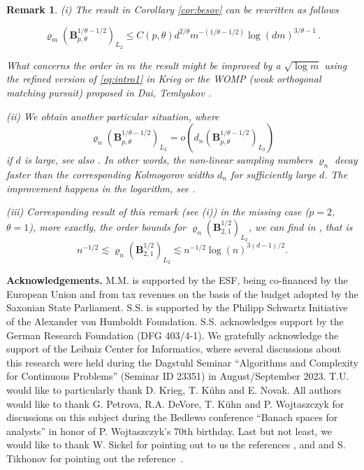 \documentclass[11pt,reqno]{article}
\numberwithin{equation}{section}
\theoremstyle{definition}
\theoremstyle{plain}
\newtheorem*{rem*}{Remark}
\begin{document}
 \begin{rem*}{\em (i)} The result in  Corollary \ref{cor:besov} can be rewritten as follows
  
$$
    \varrho_{m}(\mathbf{B}^{1/\theta-1/2}_{p,\theta})_{L_2} \leq C(p,\theta)d^{2/\theta}m^{-(1/\theta-1/2)}\log(dm)^{3/\theta - 1}\,.
$$

What concerns the order in $m$ the result might be improved by a $\sqrt{\log m}$ using the refined version of \eqref{eq:intro1} in Krieg \cite{Kr23} or the WOMP (weak orthogonal matching pursuit) proposed in Dai, Temlyakov \cite{DaTe24}. 

{\em (ii)} We obtain another particular situation, where 
$$
    \varrho_{n}(\mathbf{B}^{1/\theta-1/2}_{p,\theta})_{L_2} = o\left(d_n(\mathbf{B}^{1/\theta-1/2}_{p,\theta})_{L_2}\right)
$$
if $d$ is large, see also \cite[Cor.\ 4.16 and Rem.\ 4.17]{JUV23}. In other words, the non-linear sampling numbers $\varrho_n$ decay faster than the corresponding Kolmogorov widths $d_n$ for sufficiently large $d$. The improvement happens in the logarithm, see \cite[Thm.\ 4.5.3]{DuTeUl18}. 

{\em (iii)} Corresponding result of this remark (see (i))  in the missing case ($p=2$, $\theta=1$), more exactly, the  order bounds for $\varrho_{n}(\mathbf{B}^{1/2}_{2,1})_{L_2}$,  we can find in \cite[Thm.\ 6.4, 6.6(i)]{GlSeTi23}, that is 
 $$
   n^{-1/2} \lesssim  \varrho_{n}(\mathbf{B}^{1/2}_{2,1})_{L_2} \lesssim n^{-1/2}
   \log (n)^{3(d-1)/2} .
 $$
 
 \end{rem*}
 

\vspace{0.5cm}
{\bf Acknowledgements.}
  M.M. is supported by the ESF, being co-financed by the European Union and from tax revenues on the basis of the budget adopted by the Saxonian State Parliament. S.S. is supported 
  by the Philipp Schwartz Initiative of the Alexander von Humboldt Foundation.  
 S.S. acknowledges support by the German Research Foundation (DFG 403/4-1). 
  We gratefully acknowledge the support of the Leibniz Center for Informatics, where several discussions about this research were held during the Dagstuhl Seminar
``Algorithms and Complexity for Continuous Problems'' (Seminar ID 23351) in August/September 2023. T.U. would like to particularly thank D. Krieg, T. K\"uhn and E. Novak. All authors would like to thank G. Petrova, R.A. DeVore, T. K\"uhn and P. Wojtaszczyk for discussions on this subject during the Bedlewo conference ``Banach spaces for analysts'' in honor of P. Wojtaszczyk's 70th birthday. Last but not least, we would like to thank W. Sickel for pointing out to us the references  \cite{NNS22}, \cite{NN22} and \cite{DPW24} and S. Tikhonov for pointing out the reference \cite{DT05}\,.





\end{document}
